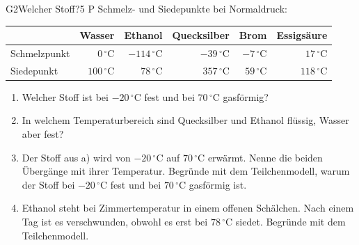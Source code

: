 \documentclass[11pt]{article}
\begin{document}
\begin{lpaufgabe}{G2}{Welcher Stoff?}{5 P}
Schmelz- und Siedepunkte bei Normaldruck:\par\smallskip
\begin{center}\begin{tabular}{lrrrrr}\toprule
 & Wasser & Ethanol & Quecksilber & Brom & Essigsäure\\\midrule
Schmelzpunkt & $0\,^\circ\text{C}$ & $-114\,^\circ\text{C}$ & $-39\,^\circ\text{C}$ & $-7\,^\circ\text{C}$ & $17\,^\circ\text{C}$\\
Siedepunkt & $100\,^\circ\text{C}$ & $78\,^\circ\text{C}$ & $357\,^\circ\text{C}$ & $59\,^\circ\text{C}$ & $118\,^\circ\text{C}$\\\bottomrule
\end{tabular}\end{center}
\begin{enumerate}[label=\alph*),leftmargin=*,itemsep=2pt,topsep=2pt]
\item Welcher Stoff ist bei $-20\,^\circ\text{C}$ fest und bei $70\,^\circ\text{C}$ gasförmig?
\item In welchem Temperaturbereich sind Quecksilber und Ethanol flüssig, Wasser aber fest?
\item Der Stoff aus a) wird von $-20\,^\circ\text{C}$ auf $70\,^\circ\text{C}$ erwärmt. Nenne die beiden Übergänge mit ihrer Temperatur. Begründe mit dem Teilchenmodell, warum der Stoff bei $-20\,^\circ\text{C}$ fest und bei $70\,^\circ\text{C}$ gasförmig ist.
\item Ethanol steht bei Zimmertemperatur in einem offenen Schälchen. Nach einem Tag ist es verschwunden, obwohl es erst bei $78\,^\circ\text{C}$ siedet. Begründe mit dem Teilchenmodell.
\end{enumerate}
\end{lpaufgabe}

\clearpage
{}
\end{document}
